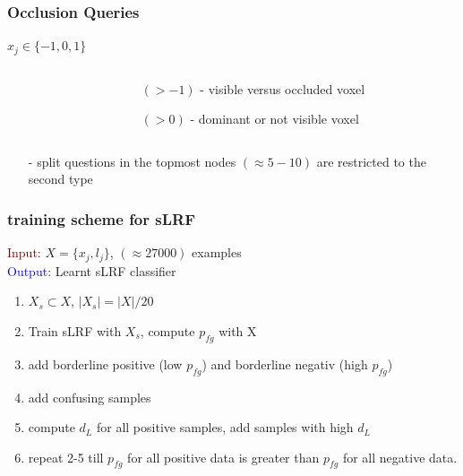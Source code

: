 \documentclass[xcolor=dvipsnames]{beamer}
\begin{document}
\begin{frame}
	\frametitle{Occlusion Queries}
	\Large
	\begin{center}
		$x_j \in \{-1, 0, 1\}$
	\end{center}
	\begin{columns}
		\begin{column}{.3\textwidth}
		\end{column}
		\begin{column}{.7\textwidth}
			\begin{itemize}
				\item[$(> -1)$ - ] visible versus occluded voxel
				\item[$(>  0)$ - ] dominant or not visible voxel
			\end{itemize}
		\end{column}
	\end{columns}
	
	\vspace{.5cm}
	\begin{itemize}
		\item[-] split questions in the topmost nodes $(\approx 5 - 10)$ are restricted to the second type
	\end{itemize}
\end{frame}

\begin{frame}
\frametitle{training scheme for sLRF}

\large

\textcolor{Maroon}{Input}: $X = \{x_j, l_j\}$, $(\approx 27000)$ examples \\
\textcolor{Blue}{Output}: Learnt sLRF classifier

\begin{enumerate}
	\item $X_s \subset X$, $\lvert X_s \rvert = \lvert X \rvert / 20$
	\item Train sLRF with $X_s$, compute $p_{fg}$ with X
	\item add borderline positive (low $p_{fg}$) and borderline negativ (high $p_{fg}$)
	\item add confusing samples
	\item compute $d_L$ for all positive samples, add samples with high $d_L$
	\item repeat 2-5 till $p_{fg}$ for all positive data is greater than $p_{fg}$ for all negative data.
\end{enumerate}

\end{frame}
\end{document}
